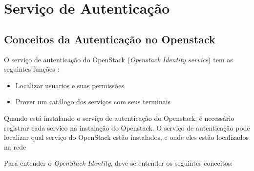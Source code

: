 \chapter{Serviço de Autenticação}

\section{Conceitos da Autenticação no Openstack}

O serviço de autenticação do OpenStack (\emph{Openstack Identity service}) tem as seguintes funções :

\begin{itemize}
	\item Localizar usuarios e suas permissões
	\item Prover um catálogo dos serviços com seus terminais	
\end{itemize}

	Quando está instalando o serviço de autenticação do Openstack, é necessário registrar cada servico na instalação do Openstack. O serviço de autenticação pode localizar qual serviço do OpenStack estão instalados, e onde eles estão localizados na rede	
	
	Para entender o \emph{OpenStack Identity}, deve-se entender os seguintes conceitos:
	
